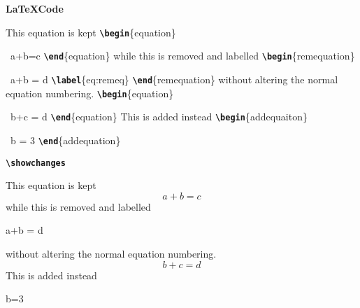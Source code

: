 \documentclass[10pt]{article}
\newcommand{\writecommand}[1]{\texttt{\textbf{{\textbackslash#1}}}}
\newcommand{\writearg}[1]{\{#1\}}
\begin{document}
\begin{center}
    \begin{minipage}[t]{0.3\linewidth}
    \textbf{\LaTeX Code}
    
    This equation is kept \newline
    \writecommand{begin}\writearg{equation}

    ~\quad a+b=c\newline
    \writecommand{end}\writearg{equation}\newline
    while this is removed and labelled\newline
    \writecommand{begin}\writearg{remequation}

    ~\quad a+b = d\newline
    \writecommand{label}\writearg{eq:remeq}\newline
    \writecommand{end}\writearg{remequation}\newline
    without altering the normal equation numbering.\newline
    \writecommand{begin}\writearg{equation}

    ~\quad b+c = d\newline
    \writecommand{end}\writearg{equation}\newline
    This is added instead
    \writecommand{begin}\writearg{addequaiton}

    ~\quad b = 3\newline
    \writecommand{end}\writearg{addequation}\newline

    \end{minipage}
    \hfill
    \begin{minipage}[t]{0.3\linewidth}
    \writecommand{showchanges}
    \showchanges
    
    This equation is kept
    \begin{equation}
        a+b = c
    \end{equation}
    while this is removed and labelled
    \begin{remequation}
        a+b = d
        \label{eq:remeq}
    \end{remequation}\addtocounter{removedeqcounter}{-1}
    without altering the normal equation numbering.
    \begin{equation}
        b+c = d
    \end{equation}
    This is added instead
    \begin{addequation}
        b=3
    \end{addequation}\addtocounter{equation}{-3}


\end{minipage}
\end{center}
\end{document}
